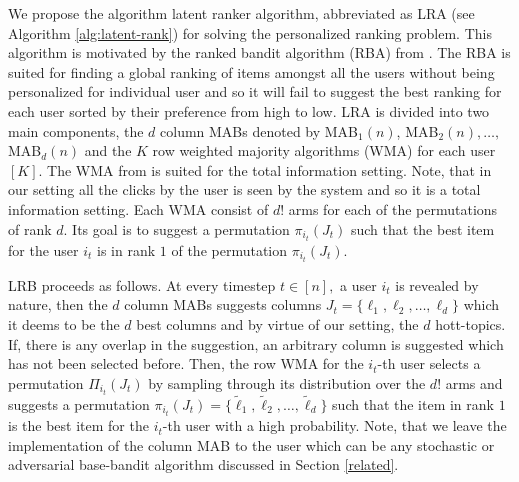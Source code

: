 We propose the algorithm latent ranker algorithm, abbreviated as LRA (see Algorithm \ref{alg:latent-rank}) for solving the personalized ranking problem. This algorithm is motivated by the ranked bandit algorithm (RBA) from \citet{radlinski2008learning}. The RBA is suited for finding a global ranking of items amongst all the users without being personalized for individual user and so it will fail to suggest the best ranking for each user sorted by their preference from high to low. LRA is divided into two main components, the $d$ column MABs denoted by MAB$_1(n)$, MAB$_2(n), \dots,$ MAB$_d(n)$ and the $K$ row weighted majority algorithms (WMA) for each user $[K]$. The WMA from \citet{littlestone1994weighted} is suited for the total information setting. Note, that in our setting all the clicks by the user is seen by the system and so it is a total information setting. Each WMA consist of $d!$ arms for each of the permutations of rank $d$. Its goal is to suggest a permutation $\pi_{i_t}(J_t)$ such that the best item for the user $i_t$ is in rank $1$ of the permutation $\pi_{i_t}(J_t)$.  


LRB proceeds as follows. At every timestep $t\in[n],$ a user $i_t$ is revealed by nature, then the $d$ column MABs suggests columns $J_t = \lbrace {\ell}_{1}, {\ell}_{2},\dots, {\ell}_{d} \rbrace$ which it deems to be the $d$ best columns and by virtue of our setting, the $d$ hott-topics. If, there is any overlap in the suggestion, an arbitrary column is suggested which has not been selected before. Then, the row WMA for the $i_t$-th user selects a permutation $\Pi_{i_t}(J_t)$ by sampling through its distribution over the $d!$ arms and suggests a permutation $\pi_{i_t}(J_t) = \lbrace \tilde{\ell}_{1}, \tilde{\ell}_{2},\dots, \tilde{\ell}_{d}\rbrace$ such that the item in rank $1$ is the best item for the $i_t$-th user with a high probability. Note, that we leave the implementation of the column MAB to the user which can be any stochastic or adversarial base-bandit algorithm discussed in Section \ref{related}. 




